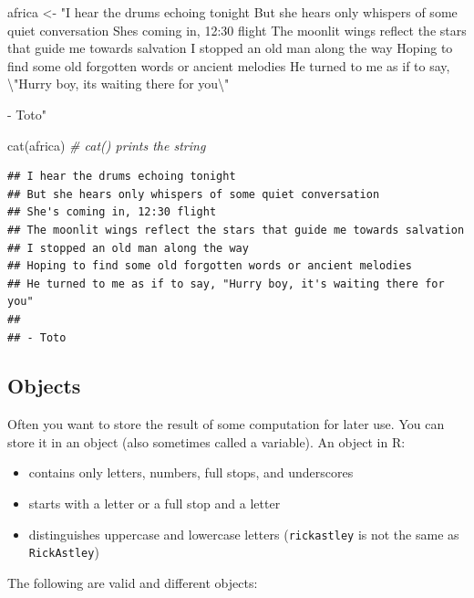 \documentclass[
  oneside]{book}
\newenvironment{Shaded}{\begin{snugshade}}{\end{snugshade}}
\newcommand{\CommentTok}[1]{\textcolor[rgb]{0.56,0.35,0.01}{\textit{#1}}}
\newcommand{\FunctionTok}[1]{\textcolor[rgb]{0.00,0.00,0.00}{#1}}
\newcommand{\NormalTok}[1]{#1}
\newcommand{\OtherTok}[1]{\textcolor[rgb]{0.56,0.35,0.01}{#1}}
\newcommand{\SpecialCharTok}[1]{\textcolor[rgb]{0.00,0.00,0.00}{#1}}
\newcommand{\StringTok}[1]{\textcolor[rgb]{0.31,0.60,0.02}{#1}}
\providecommand{\tightlist}{%
  \setlength{\itemsep}{0pt}\setlength{\parskip}{0pt}}
\begin{document}
\begin{Shaded}
\begin{Highlighting}[]
\NormalTok{africa }\OtherTok{\textless{}{-}} \StringTok{"I hear the drums echoing tonight  }
\StringTok{But she hears only whispers of some quiet conversation  }
\StringTok{She\textquotesingle{}s coming in, 12:30 flight  }
\StringTok{The moonlit wings reflect the stars that guide me towards salvation  }
\StringTok{I stopped an old man along the way  }
\StringTok{Hoping to find some old forgotten words or ancient melodies  }
\StringTok{He turned to me as if to say, }\SpecialCharTok{\textbackslash{}"}\StringTok{Hurry boy, it\textquotesingle{}s waiting there for you}\SpecialCharTok{\textbackslash{}"}

\StringTok{{-} Toto"}

\FunctionTok{cat}\NormalTok{(africa) }\CommentTok{\# cat() prints the string}
\end{Highlighting}
\end{Shaded}

\begin{verbatim}
## I hear the drums echoing tonight  
## But she hears only whispers of some quiet conversation  
## She's coming in, 12:30 flight  
## The moonlit wings reflect the stars that guide me towards salvation  
## I stopped an old man along the way  
## Hoping to find some old forgotten words or ancient melodies  
## He turned to me as if to say, "Hurry boy, it's waiting there for you"
## 
## - Toto
\end{verbatim}

\hypertarget{vars}{%
\subsection{Objects}\label{vars}}

Often you want to store the result of some computation for later use. You can store it in an object (also sometimes called a variable). An object in R:

\begin{itemize}
\tightlist
\item
  contains only letters, numbers, full stops, and underscores
\item
  starts with a letter or a full stop and a letter
\item
  distinguishes uppercase and lowercase letters (\texttt{rickastley} is not the same as \texttt{RickAstley})
\end{itemize}

The following are valid and different objects:
\end{document}

